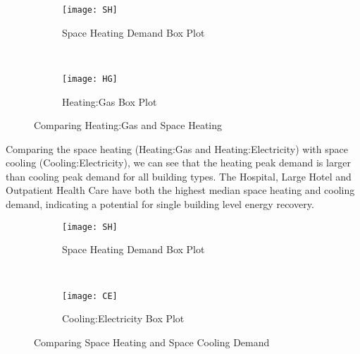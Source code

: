 \begin{figure}[h!]
  \centering
  \begin{subfigure}{0.4\textwidth}
  \centering
  \texttt{[image: SH]}
  \caption[Space Heating Demand Box Plot]{Space Heating Demand Box
    Plot}
  \label{fig:SH}
\end{subfigure}
~
\begin{subfigure}{0.4\textwidth}
  \centering
  \texttt{[image: HG]}
  \caption[Heating:Gas Box Plot]{Heating:Gas Box Plot}
  \label{fig:HG2}
\end{subfigure}
\caption[Comparing Heating:Gas and Space Heating]{Comparing
  Heating:Gas and Space Heating}
\end{figure}

Comparing the space heating (Heating:Gas and Heating:Electricity) with
space cooling (Cooling:Electricity), we can see that the heating peak
demand is larger than cooling peak demand for all building types. The
Hospital, Large Hotel and Outpatient Health Care have both the highest
median space heating and cooling demand, indicating a potential for
single building level energy recovery.
\begin{figure}[h!]
  \centering
  \begin{subfigure}{0.4\textwidth}
  \centering
  \texttt{[image: SH]}
  \caption[Space Heating Demand Box Plot]{Space Heating Demand Box
    Plot}
  \label{fig:SH}
\end{subfigure}
~
\begin{subfigure}{0.4\textwidth}
  \centering
  \texttt{[image: CE]}
  \caption[Cooling:Electricity Box Plot]{Cooling:Electricity Box Plot}
  \label{fig:CE2}
\end{subfigure}
\caption[Comparing Space Heating and Space Cooling Demand]{Comparing
  Space Heating and Space Cooling Demand}
\end{figure}

